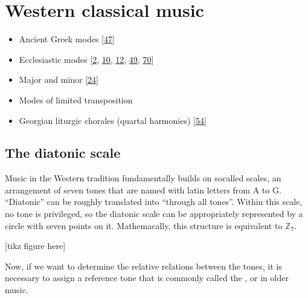 \documentclass[letterpaper,10pt,english]{sphinxmanual}
\begin{document}
\section{Western classical music}
\label{\detokenize{2_scales_modes:western-classical-music}}\begin{itemize}
\item {} 
\sphinxAtStartPar
Ancient Greek modes {[}\hyperlink{cite.8_bibliography:id57}{47}{]}

\item {} 
\sphinxAtStartPar
Ecclesiastic modes {[}\hyperlink{cite.8_bibliography:id60}{2}, \hyperlink{cite.8_bibliography:id68}{10}, \hyperlink{cite.8_bibliography:id69}{12}, \hyperlink{cite.8_bibliography:id70}{49}, \hyperlink{cite.8_bibliography:id59}{70}{]}

\item {} 
\sphinxAtStartPar
Major and minor {[}\hyperlink{cite.8_bibliography:id76}{24}{]}

\item {} 
\sphinxAtStartPar
Modes of limited transposition

\item {} 
\sphinxAtStartPar
Georgian liturgic chorales (quartal harmonies) {[}\hyperlink{cite.8_bibliography:id20}{54}{]}

\end{itemize}


\subsection{The diatonic scale}
\label{\detokenize{2_scales_modes:the-diatonic-scale}}
\sphinxAtStartPar
Music in the Western tradition fundamentally builds on
so\sphinxhyphen{}called  scales, an arrangement of seven tones
that are named with latin letters from A to G. “Diatonic” can
be roughly translated into “through all tones”. Within this scale,
no tone is privileged, so the diatonic scale can be appropriately
represented by a circle with seven points on it. Mathemacally,
this structure is equivalent to \(\mathbb{Z}_7\).

\sphinxAtStartPar
{[}tikz figure here{]}

\sphinxAtStartPar
Now, if we want to determine the relative relations between the tones,
it is necessary to assign a reference tone that is commonly called the ,
or  in older music.
\end{document}
